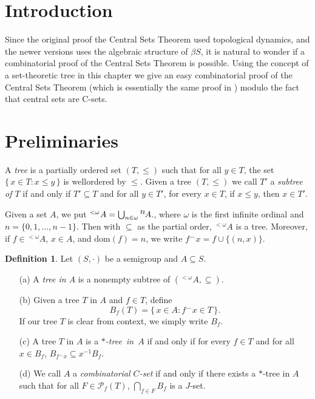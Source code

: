 \documentclass{article}
\theoremstyle{plain}
\theoremstyle{definition}
\newtheorem{defn}[thm]{Definition}
\newcommand{\Pf}{\mathcal{P}_f}
\newcommand{\dom}{\mathrm{dom}}
\newcommand{\setfunc}[2]{\hbox{${}^{\hbox{$#1$}}\hskip -1 pt #2$}}
\begin{document}
\section{Introduction}
Since the original proof the Central Sets Theorem used topological
dynamics, and the newer versions uses the algebraic structure of
$\beta S$, it is natural to wonder if a combinatorial proof of the
Central Sets Theorem is possible. 
Using the concept of a set-theoretic tree in this chapter we give an
easy combinatorial proof of the Central
Sets Theorem (which is essentially the same proof in \cite{De:2008uq})
modulo the fact that central sets are C-sets.

\section{Preliminaries}
A \textsl{tree} is a partially ordered set $(T, \le)$ such
that for all $y \in T$, the set $\{\, x \in T : x \le y \,\}$ is
wellordered by $\le$. 
Given a tree $(T, \le)$ we call $T'$ a \textsl{subtree of $T$} if and
only if $T' \subseteq T$ and for all $y \in T'$, for every $x \in T$,
if $x \le y$, then $x \in T'$. 

Given a set $A$, we put ${}^{<\omega}{A} = \bigcup_{n \in
  \omega}\setfunc{n}{A}$., where $\omega$ is the first infinite
ordinal and $n = \{0, 1, \ldots, n-1\}$. 
Then with $\subseteq$ as the partial order, ${}^{<\omega}{A}$ is a
tree. 
Moreover, if $f \in {}^{<\omega}{A}$, $x \in A$, and $\dom(f) = n$, we
write $f^\frown x = f \cup \{(n, x)\}$.

\begin{defn}
  Let $(S, \cdot)$ be a semigroup and $A \subseteq S$.
  \begin{itemize}
    \item[(a)] A \textsl{tree in A} is a nonempty subtree of
      $({}^{<\omega}{A}, \subseteq)$. 

    \item[(b)] Given a tree $T$ in $A$ and $f \in T$, define
      \[
        B_f(T) = \{\, x \in A : f^\frown x \in T \,\}.
      \]
      If our tree $T$ is clear from context, we simply write $B_f$.

    \item[(c)] A tree $T$ in $A$ is a \textsl{\mbox{$*$-tree in $A$}} if and
      only if for every $f \in T$ and for all $x \in B_f$,
      $B_{f^\frown x} \subseteq x^{-1}B_f$.

    \item[(d)] We call $A$ a \textsl{combinatorial $C$-set} if and
      only if there exists a \mbox{$*$-tree} in $A$ such that for all
      $F \in \Pf(T)$, $\bigcap_{f \in F} B_f$ is a $J$-set.
  \end{itemize}
\end{defn}
\end{document}
